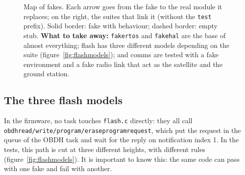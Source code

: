 \documentclass[11pt,a4paper]{article}
\DeclareRobustCommand{\_}{\textunderscore\allowbreak}
\newcommand{\cd}[1]{\texttt{#1}}
\newenvironment{slidefig}{\begin{landscape}\thispagestyle{plain}\begin{figure}[p]\centering}{\end{figure}\end{landscape}}
\begin{document}
\begin{slidefig}
\caption{Map of fakes. Each arrow goes from the fake to the real module it replaces; on the right, the suites
that link it (without the \cd{test\_} prefix). Solid border: fake with behaviour; dashed border:
empty stub. \textbf{What to take away:} \cd{fake\_rtos} and \cd{fake\_hal} are the base of almost everything; flash
has three different models depending on the suite (figure~\ref{fig:flashmodels}); and comms are tested with a
fake environment and a fake radio link that act as the satellite and the ground station.}
\label{fig:fakes}
\end{slidefig}

\subsection{The three flash models}

In the firmware, no task touches \cd{flash.c} directly: they all call
\cd{obdh\_read/write/program/erase\_program\_request}, which put the request in the queue of the
OBDH task and wait for the reply on notification index 1. In the tests, this path is
cut at three different heights, with different rules (figure~\ref{fig:flashmodels}). It is
important to know this: the same code can pass with one fake and fail with another.
\end{document}
